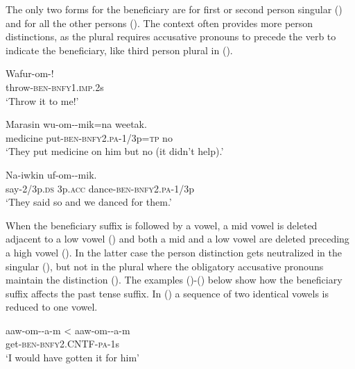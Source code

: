 The only two forms for the beneficiary are \textstyleEmphasizedVernacularWords{\nobreakdash-} for first or second person singular () and \textstyleEmphasizedVernacularWords{\nobreakdash-} for all the other persons (). The context often provides more person distinctions, as the plural requires accusative pronouns to precede the verb to indicate the beneficiary, like third person plural in (). 

\ea%
\label{ex:x225}
\gll Wafur-om-! \\
throw-\textsc{ben}-\textsc{bnfy}1.\textsc{imp}.2s \\
\glt`Throw it to me!' 
\z

\ea%
\label{ex:x226}
\gll Marasin wu-om--mik=na weetak. \\
medicine put-\textsc{ben}-\textsc{bnfy}2.\textsc{pa}-1/3p=\textsc{tp} no \\
\glt`They put medicine on him but no (it didn't help).'
\z

\ea%
\label{ex:x227}
\gll Na-iwkin  uf-om--mik. \\
say-2/3p.\textsc{ds} 3p.\textsc{acc} dance-\textsc{ben}-\textsc{bnfy}2.\textsc{pa}-1/3p \\
\glt`They said so and we danced for them.'
\z

When the beneficiary suffix is followed by a vowel, a mid vowel is deleted adjacent to a low vowel () and both a mid and a low vowel are deleted preceding a high vowel (). In the latter case the person distinction gets neutralized in the singular (), but not in the plural where the obligatory accusative pronouns maintain the distinction (). The examples ()-() below show how the beneficiary suffix affects the past tense suffix. In () a sequence of two identical vowels is reduced to one vowel.

\ea%
\label{ex:x228}
\gll aaw-om--a-m {{\textless} aaw-om}--a-m \\
get-\textsc{ben}-\textsc{bnfy}2.CNTF-\textsc{pa}-1s \\
\glt`I would have gotten it for him' 
\z

